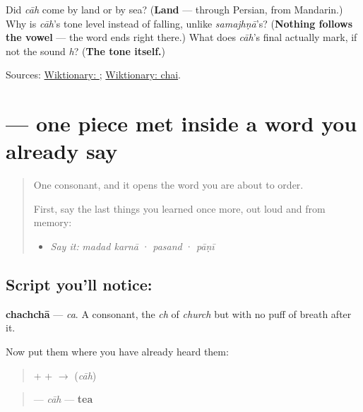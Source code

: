 \begin{tcolorbox}[breakable,colback=teal!4,colframe=teal!35!black,title={Before you move on}]
Did \emph{cāh} come by land or by sea? (\textbf{Land} — through Persian, from Mandarin.) Why is \emph{cāh}'s tone level instead of falling, unlike \emph{samajhṇā}'s? (\textbf{Nothing follows the vowel} — the word ends right there.) What does \emph{cāh}'s final \textbf{} actually mark, if not the sound \emph{h}? (\textbf{The tone itself.})

Sources: \href{https://en.wiktionary.org/wiki/\%E0\%A8\%9A\%E0\%A8\%BE\%E0\%A8\%B9}{Wiktionary: }; \href{https://en.wiktionary.org/wiki/chai}{Wiktionary: chai}.
\end{tcolorbox}
\section[\texorpdfstring{\pa{ਚ} (ca)}{ਚ (ca)}]{ — one piece met inside a word you already say}

\label{lesson:PA-S10-chachcha}



\begin{quote}
One consonant, and it opens the word you are about to order.

First, say the last things you learned once more, out loud and from memory:

\begin{itemize}
\raggedright
  \item \emph{Say it:} \emph{madad karnā} · \emph{pasand} · \emph{pāṇī}
\end{itemize}
\end{quote}

\subsection*{Script you'll notice: }
\begin{quote}
\end{quote}

\textbf{chachchā} — \emph{ca}. A consonant, the \emph{ch} of \emph{church} but with no puff of breath after it.

Now put them where you have already heard them:

\begin{quote}
\textbf{} + \textbf{} + \textbf{} $\to$ \textbf{} (\emph{cāh})
\end{quote}

\begin{quote}
\textbf{} — \emph{cāh} — \textbf{tea}
\end{quote}

